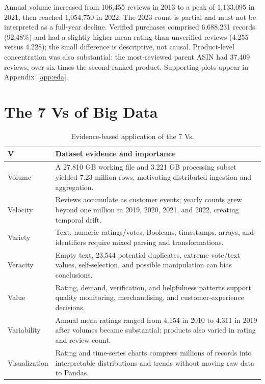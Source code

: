 \documentclass[10pt,a4paper]{article}
\begin{document}
Annual volume increased from 106,455 reviews in 2013 to a peak of 1,133,095 in 2021, then reached 1,054,750 in 2022. The 2023 count is partial and must not be interpreted as a full-year decline. Verified purchases comprised 6,688,231 records (92.48\%) and had a slightly higher mean rating than unverified reviews (4.255 versus 4.228); the small difference is descriptive, not causal. Product-level concentration was also substantial: the most-reviewed parent ASIN had 37,409 reviews, over six times the second-ranked product. Supporting plots appear in Appendix~\ref{app:eda}.

\section{The 7 Vs of Big Data}
\begin{table}[H]
\centering\scriptsize
\caption{Evidence-based application of the 7 Vs.}
\begin{tabularx}{\textwidth}{@{}p{1.3cm}Y@{}}
\toprule
\textbf{V} & \textbf{Dataset evidence and importance} \\
\midrule
Volume & A 27.810 GB working file and 3.221 GB processing subset yielded 7.23 million rows, motivating distributed ingestion and aggregation. \\
Velocity & Reviews accumulate as customer events; yearly counts grew beyond one million in 2019, 2020, 2021, and 2022, creating temporal drift. \\
Variety & Text, numeric ratings/votes, Booleans, timestamps, arrays, and identifiers require mixed parsing and transformations. \\
Veracity & Empty text, 23,544 potential duplicates, extreme vote/text values, self-selection, and possible manipulation can bias conclusions. \\
Value & Rating, demand, verification, and helpfulness patterns support quality monitoring, merchandising, and customer-experience decisions. \\
Variability & Annual mean ratings ranged from 4.154 in 2010 to 4.311 in 2019 after volumes became substantial; products also varied in rating and review count. \\
Visualization & Rating and time-series charts compress millions of records into interpretable distributions and trends without moving raw data to Pandas. \\
\bottomrule
\end{tabularx}
\end{table}
\end{document}
